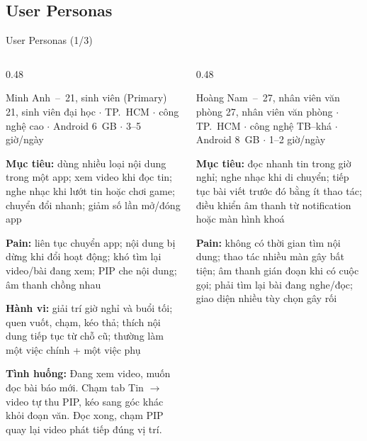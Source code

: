 \subsection{User Personas}
\begin{frame}{User Personas (1/3)}
\linespread{0.88}%
\begin{columns}[T]
\begin{column}{0.48\textwidth}
\begin{block}{\small Minh Anh~--~21, sinh viên \tiny(Primary)}
{\tiny\color{TextGray} 21, sinh viên đại học $\cdot$ TP.\ HCM $\cdot$ công nghệ cao $\cdot$ Android 6~GB $\cdot$ 3--5 giờ/ngày}\par\vspace{0.6mm}
{\tiny\textbf{Mục tiêu:} dùng nhiều loại nội dung trong một app; xem video khi đọc tin; nghe nhạc khi lướt tin hoặc chơi game; chuyển đổi nhanh; giảm số lần mở/đóng app}\par\vspace{0.4mm}
{\tiny\textbf{Pain:} liên tục chuyển app; nội dung bị dừng khi đổi hoạt động; khó tìm lại video/bài đang xem; PIP che nội dung; âm thanh chồng nhau}\par\vspace{0.4mm}
{\tiny\textbf{Hành vi:} giải trí giờ nghỉ và buổi tối; quen vuốt, chạm, kéo thả; thích nội dung tiếp tục từ chỗ cũ; thường làm một việc chính + một việc phụ}\par\vspace{0.4mm}
{\tiny\textbf{Tình huống:} Đang xem video, muốn đọc bài báo mới. Chạm tab Tin $\rightarrow$ video tự thu PIP, kéo sang góc khác khỏi đoạn văn. Đọc xong, chạm PIP quay lại video phát tiếp đúng vị trí.}
\end{block}
\end{column}
\begin{column}{0.48\textwidth}
\begin{block}{\small Hoàng Nam~--~27, nhân viên văn phòng}
{\tiny\color{TextGray} 27, nhân viên văn phòng $\cdot$ TP.\ HCM $\cdot$ công nghệ TB--khá $\cdot$ Android 8~GB $\cdot$ 1--2 giờ/ngày}\par\vspace{0.6mm}
{\tiny\textbf{Mục tiêu:} đọc nhanh tin trong giờ nghỉ; nghe nhạc khi di chuyển; tiếp tục bài viết trước đó bằng ít thao tác; điều khiển âm thanh từ notification hoặc màn hình khoá}\par\vspace{0.4mm}
{\tiny\textbf{Pain:} không có thời gian tìm nội dung; thao tác nhiều màn gây bất tiện; âm thanh gián đoạn khi có cuộc gọi; phải tìm lại bài đang nghe/đọc; giao diện nhiều tùy chọn gây rối}\par\vspace{0.4mm}

\end{block}
\end{column}
\end{columns}
\end{frame}
